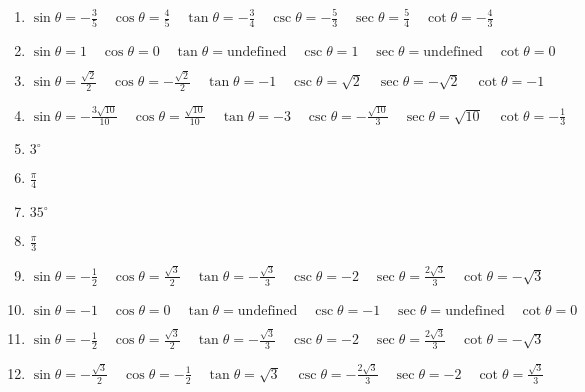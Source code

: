 \documentclass[11pt]{article}
\begin{document}
\begin{enumerate}
    \item $\sin\theta = -\frac{3}{5} \quad \cos\theta = \frac{4}{5} \quad \tan\theta = -\frac{3}{4} \quad \csc\theta = -\frac{5}{3} \quad \sec\theta = \frac{5}{4} \quad \cot\theta = -\frac{4}{3}$
    
    \item $\sin\theta = 1 \quad \cos\theta = 0 \quad \tan\theta = \text{undefined} \quad \csc\theta = 1 \quad \sec\theta = \text{undefined} \quad \cot\theta = 0$
    
    \item $\sin\theta = \frac{\sqrt{2}}{2} \quad \cos\theta = -\frac{\sqrt{2}}{2} \quad \tan\theta = -1 \quad \csc\theta = \sqrt{2} \quad \sec\theta = -\sqrt{2} \quad \cot\theta = -1$
    
    \item $\sin\theta = -\frac{3\sqrt{10}}{10} \quad \cos\theta = \frac{\sqrt{10}}{10} \quad \tan\theta = -3 \quad \csc\theta = -\frac{\sqrt{10}}{3} \quad \sec\theta = \sqrt{10} \quad \cot\theta = -\frac{1}{3}$
    
    \item $3^\circ$
    \item $\frac{\pi}{4}$
    \item $35^\circ$
    \item $\frac{\pi}{3}$
    
    \item $\sin\theta = -\frac{1}{2} \quad \cos\theta = \frac{\sqrt{3}}{2} \quad \tan\theta = -\frac{\sqrt{3}}{3} \quad \csc\theta = -2 \quad \sec\theta = \frac{2\sqrt{3}}{3} \quad \cot\theta = -\sqrt{3}$
    
    \item $\sin\theta = -1 \quad \cos\theta = 0 \quad \tan\theta = \text{undefined} \quad \csc\theta = -1 \quad \sec\theta = \text{undefined} \quad \cot\theta = 0$
    
    \item $\sin\theta = -\frac{1}{2} \quad \cos\theta = \frac{\sqrt{3}}{2} \quad \tan\theta = -\frac{\sqrt{3}}{3} \quad \csc\theta = -2 \quad \sec\theta = \frac{2\sqrt{3}}{3} \quad \cot\theta = -\sqrt{3}$
    
    \item $\sin\theta = -\frac{\sqrt{3}}{2} \quad \cos\theta = - \frac{1}{2} \quad \tan\theta = \sqrt{3} \quad \csc\theta = -\frac{2\sqrt{3}}{3} \quad \sec \theta = -2 \quad \cot\theta = \frac{\sqrt{3}}{3}$
\end{enumerate}
\end{document}

